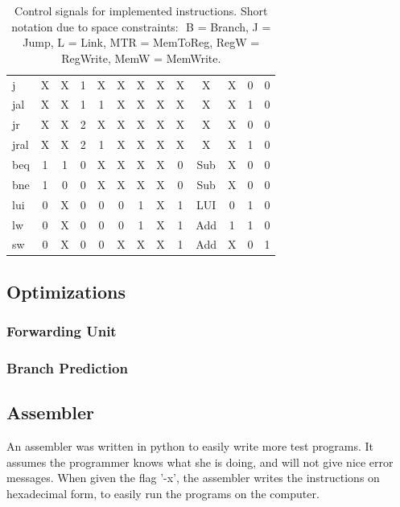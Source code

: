 \begin{table}[ht]
\begin{tabular}{|l|c|c|c|c|c|c|c|c|c|c|c|c|}
        \hline
        j          & X & X & 1 & X & X & X & X & X & X   & X & 0 & 0 \\
        jal        & X & X & 1 & 1 & X & X & X & X & X   & X & 1 & 0 \\
        jr         & X & X & 2 & X & X & X & X & X & X   & X & 0 & 0 \\
        jral       & X & X & 2 & 1 & X & X & X & X & X   & X & 1 & 0 \\
        \hline
        beq        & 1 & 1 & 0 & X & X & X & X & 0 & Sub & X & 0 & 0 \\
        bne        & 1 & 0 & 0 & X & X & X & X & 0 & Sub & X & 0 & 0 \\
        \hline
        lui        & 0 & X & 0 & 0 & 0 & 1 & X & 1 & LUI & 0 & 1 & 0 \\
        lw         & 0 & X & 0 & 0 & 0 & 1 & X & 1 & Add & 1 & 1 & 0 \\
        sw         & 0 & X & 0 & 0 & X & X & X & 1 & Add & X & 0 & 1 \\
        \hline
    \end{tabular}
    \caption{Control signals for implemented instructions. Short notation due to space constraints: $ $ B = Branch, J = Jump, L = Link, MTR = MemToReg, RegW = RegWrite, MemW = MemWrite.}
    \label{table:ctrlsignals}
\end{table}


\subsection{Optimizations}
\subsubsection*{Forwarding Unit}

\subsubsection*{Branch Prediction}

\subsection{Assembler}
An assembler was written in python to easily write more test programs. It
assumes the programmer knows what she is doing, and will not give nice error
messages. When given the flag '-x', the assembler writes the instructions on
hexadecimal form, to easily run the programs on the computer.
